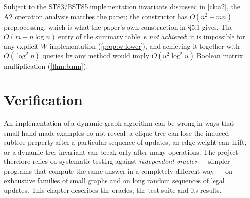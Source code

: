 \documentclass[11pt,a4paper,oneside]{report}
\theoremstyle{plain}
\theoremstyle{definition}
\theoremstyle{remark}
\begin{document}
\begin{summarybox}
Subject to the ST83/BST85 implementation invariants discussed in \cref{ch:a2}, the A2 operation analysis matches the paper; the constructor has \(O(n^2+mn)\)
preprocessing, which is what the paper's own construction in \S5.1 gives. The
\(O(m+n\log n)\) entry of the summary table is \emph{not achieved}: it is impossible for any
explicit-\(W\) implementation (\cref{prop:w-lower}), and achieving it together with
\(O(\log^2 n)\) queries by any method would imply \(O(u^2\log^2 u)\) Boolean matrix
multiplication (\cref{thm:bmm}).
\end{summarybox}
\chapter{Verification}\label{ch:verification}
An implementation of a dynamic graph algorithm can be wrong in ways that small hand-made
examples do not reveal: a clique tree can lose the induced subtree property after a particular
sequence of updates, an edge weight can drift, or a dynamic-tree invariant can break only after
many operations. The project therefore relies on systematic testing against \emph{independent
oracles} --- simpler programs that compute the same answer in a completely different way --- on
exhaustive families of small graphs and on long random sequences of legal updates. This chapter
describes the oracles, the test suite and its results.
\end{document}
